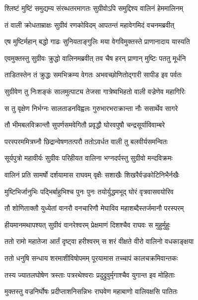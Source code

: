 \twolineshloka
{श्लिष्टं मुष्टिं समुद्यम्य संरब्धतरमागतः}
{सुग्रीवोऽपि समुद्दिश्य वालिनं हेममालिनम्} %

\twolineshloka
{तं वाली क्रोधताम्राक्षः सुग्रीवं रणकोविदम्}
{आपतन्तं महावेगमिदं वचनमब्रवीत्} %

\twolineshloka
{एष मुष्टिर्महान् बद्धो गाढः सुनियताङ्गुलिः}
{मया वेगविमुक्तस्ते प्राणानादाय यास्यति} %

\twolineshloka
{एवमुक्तस्तु सुग्रीवः क्रुद्धो वालिनमब्रवीत्}
{तव चैष हरन् प्राणान् मुष्टिः पततु मूर्धनि} %

\twolineshloka
{ताडितस्तेन तं क्रुद्धः समभिक्रम्य वेगतः}
{अभवच्छोणितोद्गारी सापीड इव पर्वतः} %

\twolineshloka
{सुग्रीवेण तु निःशङ्कं सालमुत्पाट्य तेजसा}
{गात्रेष्वभिहतो वाली वज्रेणेव महागिरिः} %

\twolineshloka
{स तु वृक्षेण निर्भग्नः सालताडनविह्वलः}
{गुरुभारभराक्रान्ता नौः ससार्थेव सागरे} %

\twolineshloka
{तौ भीमबलविक्रान्तौ सुपर्णसमवेगितौ}
{प्रवृद्धौ घोरवपुषौ चन्द्रसूर्याविवाम्बरे} %

\twolineshloka
{परस्परममित्रघ्नौ छिद्रान्वेषणतत्परौ}
{ततोऽवर्धत वाली तु बलवीर्यसमन्वितः} %

\twolineshloka
{सूर्यपुत्रो महावीर्यः सुग्रीवः परिहीयत}
{वालिना भग्नदर्पस्तु सुग्रीवो मन्दविक्रमः} %

\twolineshloka
{वालिनं प्रति सामर्षो दर्शयामास राघवम्}
{वृक्षैः सशाखैः शिखरैर्वज्रकोटिनिभैर्नखैः} %

\twolineshloka
{मुष्टिभिर्जानुभिः पद्भिर्बाहुभिश्च पुनः पुनः}
{तयोर्युद्धमभूद् घोरं वृत्रवासवयोरिव} %

\twolineshloka
{तौ शोणिताक्तौ युध्येतां वानरौ वनचारिणौ}
{मेघाविव महाशब्दैस्तर्जमानौ परस्परम्} %

\twolineshloka
{हीयमानमथापश्यत् सुग्रीवं वानरेश्वरम्}
{प्रेक्षमाणं दिशश्चैव राघवः स मुहुर्मुहुः} %

\twolineshloka
{ततो रामो महातेजा आर्तं दृष्ट्वा हरीश्वरम्}
{स शरं वीक्षते वीरो वालिनो वधकाङ्क्षया} %

\twolineshloka
{ततो धनुषि सन्धाय शरमाशीविषोपमम्}
{पूरयामास तच्चापं कालचक्रमिवान्तकः} %

\twolineshloka
{तस्य ज्यातलघोषेण त्रस्ताः पत्ररथेश्वराः}
{प्रदुद्रुवुर्मृगाश्चैव युगान्त इव मोहिताः} %

\twolineshloka
{मुक्तस्तु वज्रनिर्घोषः प्रदीप्ताशनिसन्निभः}
{राघवेण महाबाणो वालिवक्षसि पातितः} %

